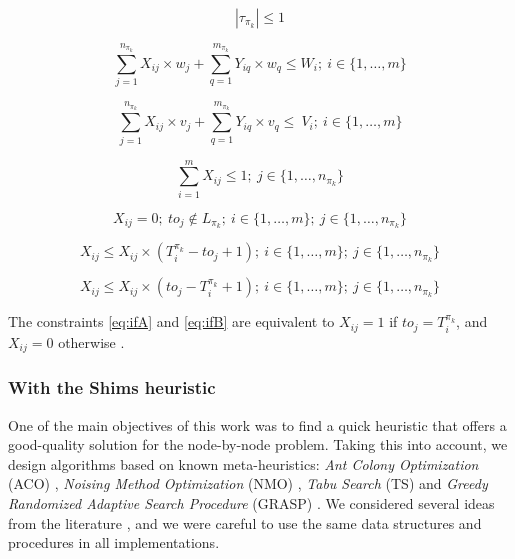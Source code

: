 \documentclass[preprint]{elsarticle}
\begin{document}
\begin{equation} \label{eq:tau2}
	|\tau_{\pi_k}| \leq 1
\end{equation}

\begin{equation} 
	\sum_{j=1}^{n_{\pi_k}} X_{ij} \times w_j + \sum_{q=1}^{m_{\pi_k}} Y_{iq} \times w_q  \leq W_i; \ i \in \{1, \ldots, m\}
\end{equation}

\begin{equation} 
	\sum_{j=1}^{n_{\pi_k}} X_{ij} \times v_j + \sum_{q=1}^{m_{\pi_k}} Y_{iq} \times v_q  \leq\ V_i; \ i \in \{1, \ldots, m\}
\end{equation}

\begin{equation} 
	\sum_{i=1}^{m} X_{ij} \leq 1; \ j \in \{1, \ldots, n_{\pi_k}\}
\end{equation}

\begin{equation} \label{eq:if2}
	X_{ij} = 0;\ to_j \notin L_{\pi_k}; \ i \in \{1, \ldots, m\}; \ j \in \{1, \ldots, n_{\pi_k}\}
\end{equation}

\begin{equation} \label{eq:ifA}
	X_{ij} \leq X_{ij} \times (T_i^{\pi_k} - to_j + 1); \ i \in \{1, \ldots, m\}; \ j \in \{1, \ldots, n_{\pi_k}\}
\end{equation}

\begin{equation} \label{eq:ifB}
	X_{ij} \leq X_{ij} \times (to_j - T_i^{\pi_k} + 1 ); \ i \in \{1, \ldots, m\}; \ j \in \{1, \ldots, n_{\pi_k}\}
\end{equation}

The constraints \ref{eq:ifA} and \ref{eq:ifB} are equivalent to $X_{ij} =1$\/ if $to_j = T_i^{\pi_k}$, and $X_{ij} =0$\/ otherwise .


\subsubsection{With the Shims heuristic}

One of the main objectives of this work was to find a quick heuristic that offers a good-quality solution for the node-by-node problem. Taking this into account, we design algorithms based on known meta-heuristics: {\it Ant Colony Optimization} (ACO) \cite{Dorigo1992, DorigoManiezzoColorni1996}, {\it Noising Method Optimization} (NMO) \cite{CharonHudry1993,CharonHudry2001,Zhan2020}, {\it Tabu Search} (TS) \cite{Glover1986} and {\it Greedy Randomized Adaptive Search Procedure} (GRASP) \cite{FeoResende1989}. We considered several ideas from the literature \cite{NiarFreville1997,Fidanova2006,Laabadi2018,Alonso2019,Zhan2020}, and we were careful to use the same data structures and procedures in all implementations.
\end{document}
